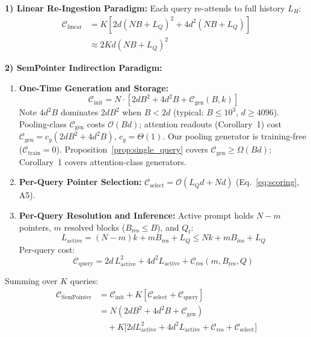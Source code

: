 \documentclass[conference]{IEEEtran}
\begin{document}
{\noindent\textbf{1) Linear Re-Ingestion Paradigm:}
Each query re-attends to full history $L_H$:
\begin{align}
    \mathcal{C}_{\text{linear}} &= K \left[ 2 d (NB + L_Q)^2 + 4 d^2 (NB + L_Q) \right] \nonumber \\
&\approx 2 K d (NB + L_Q)^2
\end{align}

\noindent\textbf{2) SemPointer Indirection Paradigm:}
\begin{enumerate}\setlength{\itemsep}{1pt}\setlength{\parsep}{0pt}\setlength{\topsep}{1.5pt}
    \item \textbf{One-Time Generation and Storage:}
    \begin{equation}
    \mathcal{C}_{\text{init}} = N \cdot \left[ 2 d B^2 + 4 d^2 B + \mathcal{C}_{\text{gen}}(B, k) \right]
    \end{equation}
    Note $4d^2B$ dominates $2dB^2$ when $B < 2d$ (typical: $B \le 10^3$, $d \geq 4096$). Pooling-class $\mathcal{C}_{\text{gen}}$ costs $\mathcal{O}(Bd)$; attention readouts (Corollary~1) cost $\mathcal{C}_{\text{gen}} = c_g(2dB^2 + 4d^2 B)$, $c_g = \Theta(1)$. Our pooling generator is training-free ($\mathcal{C}_{\mathrm{train}}=0$). Proposition~\ref{prop:single_query} covers $\mathcal{C}_{\mathrm{gen}} \ge \Omega(Bd)$; Corollary~1 covers attention-class generators.
    \item \textbf{Per-Query Pointer Selection:} $\mathcal{C}_{\mathrm{select}} = \mathcal{O}(L_Q d + Nd)$ (Eq.~\eqref{eq:scoring}, A5).
    \item \textbf{Per-Query Resolution and Inference:} Active prompt holds $N-m$ pointers, $m$ resolved blocks ($B_{\text{res}} \le B$), and $Q_t$:
    \begin{equation}\label{eq:active_seq}
    L_{\mathrm{active}} = (N-m)k + m B_{\mathrm{res}} + L_Q \le Nk + m B_{\mathrm{res}} + L_Q
    \end{equation}
    Per-query cost:
    \begin{equation}
    \mathcal{C}_{\text{query}} = 2 d\, L_{\mathrm{active}}^2 + 4 d^2 L_{\mathrm{active}} + \mathcal{C}_{\text{res}}(m, B_{\text{res}}, Q)
    \end{equation}
\end{enumerate}
Summing over $K$ queries:
\begin{align}
\mathcal{C}_{\text{SemPointer}} &= \mathcal{C}_{\mathrm{init}} + K[\mathcal{C}_{\mathrm{select}} + \mathcal{C}_{\mathrm{query}}] \nonumber \\
&= N(2dB^2 + 4d^2B + \mathcal{C}_{\mathrm{gen}}) \nonumber \\
&\quad + K\big[2dL_{\mathrm{active}}^2 + 4d^2 L_{\mathrm{active}} + \mathcal{C}_{\mathrm{res}} + \mathcal{C}_{\mathrm{select}}\big]
\end{align}

}
\end{document}

